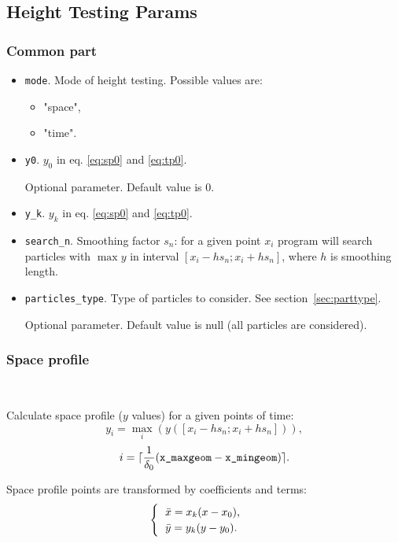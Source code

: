 \subsection{Height Testing Params}

\subsubsection{Common part}
\begin{itemize}
    \item \verb|mode|. Mode of height testing. Possible values are: 
    \begin{itemize}
        \item "space",
        \item "time".
    \end{itemize}
    
    \item \verb|y0|. $y_{0}$ in eq. \ref{eq:sp0} and \ref{eq:tp0}.
    
    Optional parameter. Default value is 0.
    \item \verb|y_k|. $y_{k}$ in eq. \ref{eq:sp0} and \ref{eq:tp0}.
    \item \verb|search_n|. Smoothing factor $s_{n}$: for a given point $x_{i}$ program will search particles with $\max y$ in interval $[x_{i} - hs_{n}; x_{i} + hs_{n}]$, where $h$ is smoothing length.
    \item \verb|particles_type|. Type of particles to consider. See section~\ref{sec:parttype}.

    Optional parameter. Default value is null (all particles are considered).
\end{itemize}

\subsubsection{Space profile}\

Calculate space profile ($y$ values) for a given points of time:
\begin{equation}
    y_{i} = \max\limits_{i}(y([x_{i} - hs_{n}; x_{i} + hs_{n}])),
\end{equation}
\begin{equation}
    i = \lceil \frac{1}{\delta_{0}} (\verb|x_maxgeom| - \verb|x_mingeom|) \rceil.
\end{equation}

Space profile points are transformed by coefficients and terms:
\begin{equation}\label{eq:sp0}
    \begin{cases}
      \begin{tabular}{l}
          $\Bar{x} = x_{k} (x - x_{0})$, 
          \\
          $\Bar{y} = y_{k} (y - y_{0})$.
      \end{tabular}  
    \end{cases} 
\end{equation}

